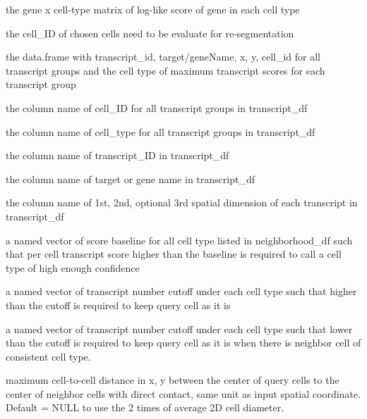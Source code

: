 \documentclass[letterpaper]{book}
\begin{document}
\begin{Arguments}
\begin{ldescription}
\item[\code{score\_GeneMatrix}] the gene x cell-type matrix of log-like score of gene in each cell type

\item[\code{chosen\_cells}] the cell\_ID of chosen cells need to be evaluate for re-segmentation

\item[\code{reseg\_transcript\_df}] the data.frame with transcript\_id, target/geneName, x, y, cell\_id for all transcript groups and the cell type of maximum transcript scores for each transcript group

\item[\code{reseg\_cellID\_coln}] the column name of cell\_ID for all transcript groups in transcript\_df

\item[\code{reseg\_celltype\_coln}] the column name of cell\_type for all transcript groups in transcript\_df

\item[\code{transID\_coln}] the column name of transcript\_ID in transcript\_df

\item[\code{transGene\_coln}] the column name of target or gene name in transcript\_df

\item[\code{transSpatLocs\_coln}] the column name of 1st, 2nd, optional 3rd spatial dimension of each transcript in transcript\_df

\item[\code{score\_baseline}] a named vector of score baseline for all cell type listed in neighborhood\_df such that per cell transcript score higher than the baseline is required to call a cell type of high enough confidence

\item[\code{lowerCutoff\_transNum}] a named vector of transcript number cutoff under each cell type such that higher than the cutoff is required to keep query cell as it is

\item[\code{higherCutoff\_transNum}] a named vector of transcript number cutoff under each cell type such that lower than the cutoff is required to keep query cell as it is when there is neighbor cell of consistent cell type.

\item[\code{neighbor\_distance\_xy}] maximum cell-to-cell distance in x, y between the center of query cells to the center of neighbor cells with direct contact, same unit as input spatial coordinate. Default = NULL to use the 2 times of average 2D cell diameter.


\end{ldescription}
\end{Arguments}
\end{document}
